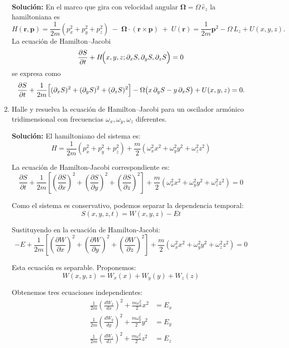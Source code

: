 \documentclass[12pt]{article}
\begin{document}
\begin{enumerate}
  \textbf{Solución:}  
  En el marco que gira con velocidad angular \(\boldsymbol\Omega=\Omega\,\hat e_z\) la hamiltoniana es
  \[
    H(\mathbf r,\mathbf p)
    = \frac{1}{2m}(p_x^2+p_y^2+p_z^2)
      \;-\;\boldsymbol\Omega\cdot(\mathbf r\times\mathbf p)
      \;+\;U(\mathbf r)
    = \frac{1}{2m}\mathbf p^2 - \Omega\,L_z + U(x,y,z).
  \]
  La ecuación de Hamilton–Jacobi
  \[
    \frac{\partial S}{\partial t}
    + H\!\Bigl(x,y,z;\partial_xS,\partial_yS,\partial_zS\Bigr)
    = 0
  \]
  se expresa como
  \[
    \frac{\partial S}{\partial t}
    + \frac{1}{2m}\Bigl[(\partial_xS)^2+(\partial_yS)^2+(\partial_zS)^2\Bigr]
    - \Omega\bigl(x\,\partial_yS - y\,\partial_xS\bigr)
    + U(x,y,z)
    = 0.
  \]
  \item Halle y resuelva la ecuación de Hamilton–Jacobi para un oscilador armónico tridimensional con frecuencias \(\omega_x,\omega_y,\omega_z\) diferentes.
  
  \textbf{Solución:} 
  El hamiltoniano del sistema es:
  \[
  H = \frac{1}{2m}(p_x^2 + p_y^2 + p_z^2) + \frac{m}{2}(\omega_x^2 x^2 + \omega_y^2 y^2 + \omega_z^2 z^2)
  \]

  La ecuación de Hamilton-Jacobi correspondiente es:
  \[
  \frac{\partial S}{\partial t} + \frac{1}{2m}\left[\left(\frac{\partial S}{\partial x}\right)^2 + \left(\frac{\partial S}{\partial y}\right)^2 + \left(\frac{\partial S}{\partial z}\right)^2\right] + \frac{m}{2}(\omega_x^2 x^2 + \omega_y^2 y^2 + \omega_z^2 z^2) = 0
  \]

  Como el sistema es conservativo, podemos separar la dependencia temporal:
  \[
  S(x,y,z,t) = W(x,y,z) - Et
  \]

  Sustituyendo en la ecuación de Hamilton-Jacobi:
  \[
  -E + \frac{1}{2m}\left[\left(\frac{\partial W}{\partial x}\right)^2 + \left(\frac{\partial W}{\partial y}\right)^2 + \left(\frac{\partial W}{\partial z}\right)^2\right] + \frac{m}{2}(\omega_x^2 x^2 + \omega_y^2 y^2 + \omega_z^2 z^2) = 0
  \]

  Esta ecuación es separable. Proponemos:
  \[
  W(x,y,z) = W_x(x) + W_y(y) + W_z(z)
  \]

  Obtenemos tres ecuaciones independientes:
  \begin{align}
  \frac{1}{2m}\left(\frac{dW_x}{dx}\right)^2 + \frac{m\omega_x^2}{2}x^2 &= E_x\\
  \frac{1}{2m}\left(\frac{dW_y}{dy}\right)^2 + \frac{m\omega_y^2}{2}y^2 &= E_y\\
  \frac{1}{2m}\left(\frac{dW_z}{dz}\right)^2 + \frac{m\omega_z^2}{2}z^2 &= E_z
  \end{align}


\end{enumerate}
\end{document}
